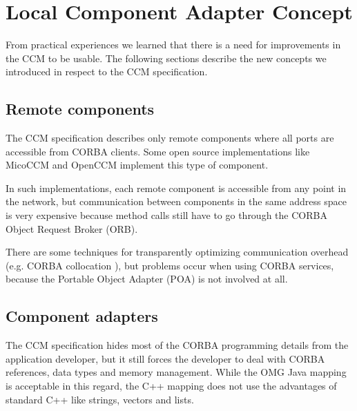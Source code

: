 \chapter{Local Component Adapter Concept}

From practical experiences we learned that there is a need for improvements in
the CCM to be usable. The following sections describe the new concepts we
introduced in respect to the CCM specification.


\section{Remote components}

The CCM specification describes only remote components where all ports are
accessible from CORBA clients. Some open source implementations like MicoCCM
\cite{MicoCCM} and OpenCCM \cite{MarvieMerle2001} implement this type of
component.

In such implementations, each remote component is accessible from any point in
the network, but communication between components in the same address space is
very expensive because method calls still have to go through the CORBA Object
Request Broker (ORB).

There are some techniques for transparently optimizing communication overhead
(e.g. CORBA collocation \cite{ObjectInterconnections18, wang00optimizing}), but
problems occur when using CORBA services, because the Portable Object Adapter
(POA) is not involved at all.


\section{Component adapters}

The CCM specification hides most of the CORBA programming details from the
application developer, but it still forces the developer to deal with CORBA
references, data types and memory management. While the OMG Java mapping
\cite{OMGIDL2Java} is acceptable in this regard, the C++ mapping
\cite{OMGIDL2Cpp} does not use the advantages of standard C++ like strings,
vectors and lists.


